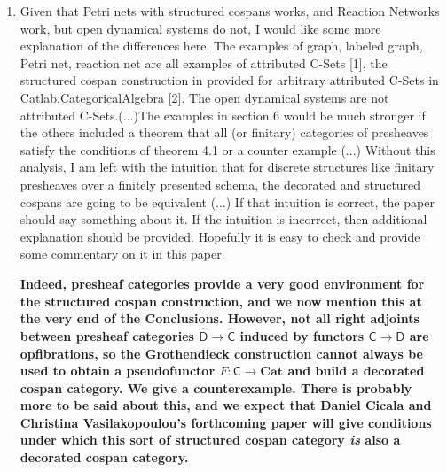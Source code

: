 \documentclass[reqno]{amsart}
\def\chris{\color{purple} Christina: }
\def\john{\color{red} John: }
\begin{document}
\begin{enumerate}
{\begin{quote}
However, for open dynamical systems we apparently need decorated cospans, for reasons we explain. 
\end{quote}
\noindent
both here and in the actual paper.  The referees may complain, but the readers will be less puzzled.}

{\chris (2) If we were being really accurate, don't we 
actually ONLY use decorated cospans to describe the map from open Petri nets with rates to open dynamical systems? Namely since dynamical systems only 
work as decorated cospans, we are required to use decorated cospans also for Petri nets to then get the map between them. Unless I am mixing something 
there.}

{\john You're right.  So I've also changed this sentence above and in the paper:

\begin{quote}
Thus, to describe a map from open Petri nets with rates to open dynamical systems, we use \emph{both} structured and decorated cospans.
\end{quote}}

{\chris Cool thanks!}

\fi 

\item Given that Petri nets with structured cospans works, and Reaction Networks work, but open dynamical systems do not, I would like some more 
explanation of the differences here. The examples of graph, labeled 
graph, Petri net, reaction net are all examples of attributed C-Sets [1], the structured cospan construction in provided for arbitrary attributed 
C-Sets in Catlab.CategoricalAlgebra [2]. The open dynamical systems are not attributed C-Sets.(...)The examples in section 6 would be much stronger 
if the others included a theorem that all (or finitary) categories of presheaves satisfy the 
conditions of theorem 4.1 or a counter example (...) Without this analysis, I am left with the intuition
that for discrete structures like finitary presheaves over a finitely presented schema, the decorated and structured cospans are going
to be equivalent (...) If that intuition is correct, the paper should say something about it. If the intuition is incorrect, then additional 
explanation should be provided. Hopefully it is easy to check and provide some commentary on it in this paper.

{\bf  Indeed, presheaf categories provide a very good environment for the structured cospan construction, and we now mention this at the very end of the Conclusions.  However, not all right adjoints between presheaf categories $\widehat{\mathsf{D}} \to \widehat{\mathsf{C}}$ induced by functors $\mathsf{C} \to \mathsf{D}$ are opfibrations, so the Grothendieck construction cannot always be used to obtain a pseudofunctor $F \colon \mathsf{C} \to \mathbf{Cat}$ and build a decorated cospan category.   We give a counterexample.   There is probably more to be said about this, and we expect that Daniel Cicala and Christina Vasilakopoulou's forthcoming paper will give
conditions under which this sort of structured cospan category \emph{is} also a decorated cospan
category.}


\end{enumerate}
\end{document}
